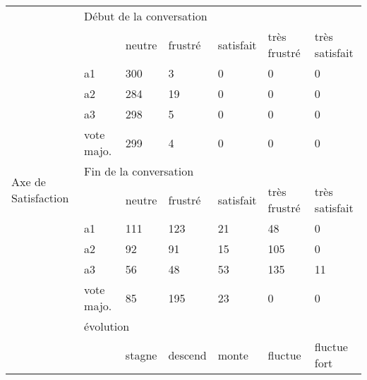 \begin{table}[]
\begin{tabular}{|l|l|l|l|l|l|l|}
\hline
\multirow{18}{*}{Axe de Satisfaction} & \multicolumn{6}{l|}{Début de la conversation}                                      \\ \cline{2-7}
                                      &                  & neutre & frustré & satisfait & très frustré & très satisfait    \\ \cline{2-7}
                                      & a1               & 300    & 3       & 0         & 0            & 0                 \\ \cline{2-7}
                                      & a2               & 284    & 19      & 0         & 0            & 0                 \\ \cline{2-7}
                                      & a3               & 298    & 5       & 0         & 0            & 0                 \\ \cline{2-7}
                                      & vote majo. & 299    & 4       & 0         & 0            & 0                 \\ \cline{2-7}
                                      & \multicolumn{6}{l|}{Fin de la conversation}                                        \\ \cline{2-7}
                                      &                  & neutre & frustré & satisfait & très frustré & très satisfait    \\ \cline{2-7}
                                      & a1               & 111    & 123     & 21        & 48           & 0                 \\ \cline{2-7}
                                      & a2               & 92     & 91      & 15        & 105          & 0                 \\ \cline{2-7}
                                      & a3               & 56     & 48      & 53        & 135          & 11                \\ \cline{2-7}
                                      & vote majo. & 85     & 195     & 23        & 0            & 0                 \\ \cline{2-7}
                                      & \multicolumn{6}{l|}{évolution}                                                     \\ \cline{2-7}
                                      &                  & stagne & descend & monte     & fluctue      & fluctue fort \\ \cline{2-7}

\end{tabular}
\end{table}
